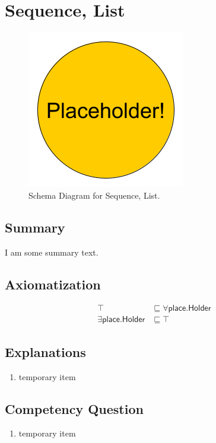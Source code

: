 \section{Sequence, List}
\label{sec:Sequence,}
\begin{figure}[h!]
\begin{center}
\includegraphics[width=.4\textwidth]{figures/placeholder}
\end{center}
\caption{Schema Diagram for Sequence, List.}
\label{fig:Sequence,}
\end{figure}
\subsection{Summary}
\label{sum:Sequence,}
I am some summary text.

\subsection{Axiomatization}
\label{axs:Sequence,}
\begin{align}
\top &\sqsubseteq \forall\textsf{place.Holder} \\ 
\exists\textsf{place.Holder} &\sqsubseteq \top 
\end{align}

\subsection{Explanations}
\label{exp:Sequence,}
\begin{enumerate}
\item temporary item
\end{enumerate}

\subsection{Competency Question}
\label{cqs:Sequence,}
\begin{enumerate}[CQ1.]
\item temporary item
\end{enumerate}

\newpage
